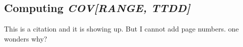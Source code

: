 \documentclass[10pt,twocolumn,letterpaper]{article}
\begin{document}
\subsection{Computing \textbf{\textit{COV[RANGE, TTDD]}}}
This is a citation \cite{Benaroya05} and it is showing up. But I cannot add page numbers. one wonders why?



{\small


}
\end{document}
